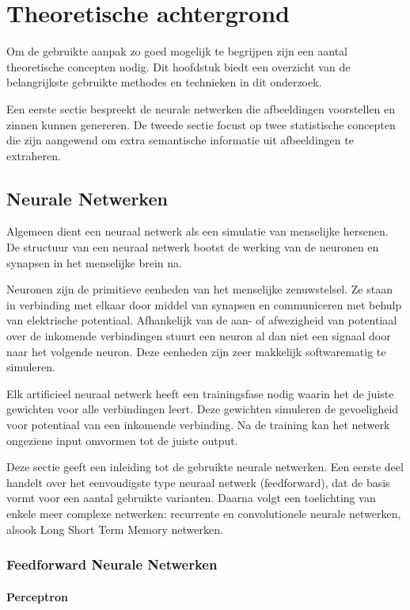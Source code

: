 \chapter{Theoretische achtergrond}
\label{hst-theorie}
Om de gebruikte aanpak zo goed mogelijk te begrijpen zijn een aantal theoretische concepten nodig. Dit hoofdstuk biedt een overzicht van de belangrijkste gebruikte methodes en technieken in dit onderzoek.

Een eerste sectie bespreekt de neurale netwerken die afbeeldingen voorstellen en zinnen kunnen genereren. De tweede sectie focust op twee statistische concepten die zijn aangewend om extra semantische informatie uit afbeeldingen te extraheren. 

\section{Neurale Netwerken}
Algemeen dient een neuraal netwerk als een simulatie van menselijke hersenen. De structuur van een neuraal netwerk bootst de werking van de neuronen en synapsen in het menselijke brein na. 

Neuronen zijn de primitieve eenheden van het menselijke zenuwstelsel. Ze staan in verbinding met elkaar door middel van synapsen en communiceren met behulp van elektrische potentiaal. Afhankelijk van de aan- of afwezigheid van potentiaal over de inkomende verbindingen stuurt een neuron al dan niet een signaal door naar het volgende neuron. Deze eenheden zijn zeer makkelijk softwarematig te simuleren.

Elk artificieel neuraal netwerk heeft een trainingsfase nodig waarin het de juiste gewichten voor alle verbindingen leert. Deze gewichten simuleren de gevoeligheid voor potentiaal van een inkomende verbinding. Na de training kan het netwerk ongeziene input omvormen tot de juiste output.

Deze sectie geeft een inleiding tot de gebruikte neurale netwerken. Een eerste deel handelt over het eenvoudigste type neuraal netwerk (feedforward), dat de basis vormt voor een aantal gebruikte varianten. Daarna volgt een toelichting van enkele meer complexe netwerken: recurrente en convolutionele neurale netwerken, alsook Long Short Term Memory netwerken.

\subsection{Feedforward Neurale Netwerken}
\subsubsection{Perceptron} %
\label{par:perceptron}

